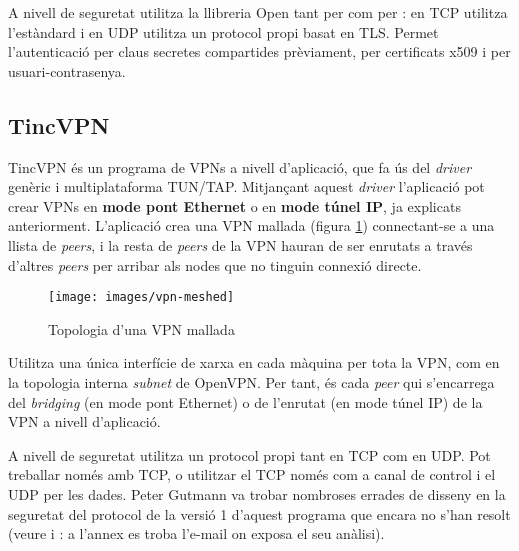 A nivell de seguretat utilitza la llibreria Open tant per  com per : en TCP utilitza l'estàndard  i en UDP utilitza un protocol propi basat en TLS. Permet l'autenticació per claus secretes compartides prèviament, per certificats x509 i per usuari-contrasenya.

\subsection{TincVPN}
TincVPN és un programa de VPNs a nivell d'aplicació, que fa ús del \emph{driver} genèric i multiplataforma TUN/TAP. Mitjançant aquest \emph{driver} l'aplicació pot crear VPNs en \textbf{mode pont Ethernet} o en \textbf{mode túnel IP}, ja explicats anteriorment. L'aplicació crea una VPN mallada (figura \ref{F:vpn-meshed}) connectant-se a una llista de \emph{peers}, i la resta de \emph{peers} de la VPN hauran de ser enrutats a través d'altres \emph{peers} per arribar als nodes que no tinguin connexió directe.
\begin{figure}[htb]
\centering
\texttt{[image: images/vpn-meshed]}
\caption{Topologia d'una VPN mallada}
\label{F:vpn-meshed}
\end{figure}

Utilitza una única interfície de xarxa en cada màquina per tota la VPN, com en la topologia interna \emph{subnet} de OpenVPN. Per tant, és cada \emph{peer} qui s'encarrega del \emph{bridging} (en mode pont Ethernet) o de l'enrutat (en mode túnel IP) de la VPN a nivell d'aplicació.

\label{TincVPN-Sec}
A nivell de seguretat utilitza un protocol propi tant en TCP com en UDP. Pot treballar només amb TCP, o utilitzar el TCP només com a canal de control i el UDP per les dades. Peter Gutmann va trobar nombroses errades de disseny en la seguretat del protocol de la versió 1 d'aquest programa que encara no s'han resolt (veure \cite{latm-metzdowd} i \cite{tinc-sec}: a l'annex  es troba l'e-mail on exposa el seu anàlisi).

